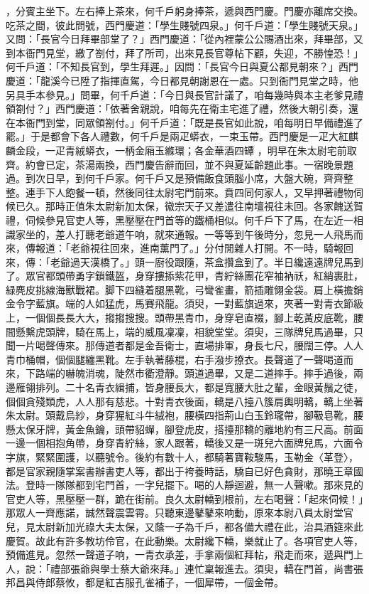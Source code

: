 \begin{showcontents}{}
，分賓主坐下。左右捧上茶來，何千戶躬身捧茶，遞與西門慶。門慶亦離席交換。吃茶之間，彼此問號，西門慶道：「學生賤號四泉。」何千戶道：「學生賤號天泉。」又問：「長官今日拜畢部堂了？」西門慶道：「從內裡蒙公公賜酒出來，拜畢部，又到本衙門見堂，繳了劄付，拜了所司，出來見長官尊帖下顧，失迎，不勝惶恐！」何千戶道：「不知長官到，學生拜遲。」因問：「長官今日與夏公都見朝來？」西門慶道：「龍溪今已陞了指揮直駕，今日都見朝謝恩在一處。只到衙門見堂之時，他另具手本參見。」問畢，何千戶道：「今日與長官計議了，咱每幾時與本主老爹見禮領劄付？」西門慶道：「依著舍親說，咱每先在衛主宅進了禮，然後大朝引奏，還在本衙門到堂，同眾領劄付。」何千戶道：「既是長官如此說，咱每明日早備禮進了罷。」于是都會下各人禮數，何千戶是兩疋蟒衣，一束玉帶。西門慶是一疋大紅麒麟金段，一疋青絨蟒衣，一柄金廂玉縧環；各金華酒四罈 ，明早在朱太尉宅前取齊。約會已定，茶湯兩換，西門慶告辭而回，並不與夏延齡題此事。一宿晚景題過。到次日早，到何千戶家。何千戶又是預備飯食頭腦小席，大盤大碗，齊齊整整。連手下人飽餐一頓，然後同往太尉宅門前來。賁四同何家人，又早押著禮物伺候已久。那時正值朱太尉新加太保，徽宗天子又差遣往南壇視往未回。各家餽送賀禮，伺候參見官吏人等，黑壓壓在門首等的鐵桶相似。何千戶下了馬，在左近一相識家坐的，差人打聽老爺道午响，就來通報。一等等到午後時分，忽見一人飛馬而來，傳報道：「老爺視往回來，進南薰門了。」分付閒雜人打開。不一時，騎報回來，傳：「老爺過天漢橋了。」頭一廚役跟隨，茶盒攢盒到了。半日纔遠遠牌兒馬到了。眾官都頭帶勇字鎖鐵盔，身穿摟掭紫花甲，青紵絲團花窄袖衲祅，紅綃裹肚，緑麂皮挑線海獸戰裙。脚下四縫着腿黑靴，弓彎雀畫，箭插雕翎金袋。肩上橫擔銷金令字藍旗。端的人如猛虎，馬賽飛龍。須臾，一對藍旗過來，夾著一對青衣節級上，一個個長長大大，搊搊搜搜。頭帶黑青巾，身穿皂直裰，腳上乾黃皮底靴，腰間懸繫虎頭牌，騎在馬上，端的威風凜凜，相貌堂堂。須臾，三隊牌兒馬過畢，只聞一片喝聲傳來。那傳道者都是金吾衛士，直場排軍，身長七尺，腰闊三停。人人青巾桶帽，個個腿纏黑靴。左手執著藤棍，右手潑步撩衣。長聲道了一聲喝道而來，下路端的嚇魄消魂，陡然市衢澄靜。頭道過畢，又是二道摔手。摔手過後，兩邊雁翎排列。二十名青衣緝捕，皆身腰長大，都是寬腰大肚之輩，金眼黃鬚之徒，個個貪殘類虎，人人那有慈悲。十對青衣後面，轎是八擡八簇肩輿明轎，轎上坐著朱太尉。頭戴烏紗，身穿猩紅斗牛絨袍，腰橫四指荊山白玉鈴瓏帶，腳靸皂靴，腰懸太保牙牌，黃金魚鑰，頭帶貂蟬，腳登虎皮，搭擡那轎的離地約有三尺高。前面一邊一個相抱角帶，身穿青紵絲，家人跟著，轎後又是一斑兒六面牌兒馬，六面令字旗，緊緊圍護，以聽號令。後約有數十人，都騎著寶鞍駿馬，玉勒金〈革登〉，都是官家親隨掌案書辦書吏人等，都出于袴養時話，驕自已好色貪財，那曉王章國法。登時一隊隊都到宅門首，一字兒擺下。喝的人靜迴避，無一人聲嗽。那來見的官吏人等，黑壓壓一群，跪在街前。良久太尉轎到根前，左右喝聲：「起來伺候！」那眾人一齊應諾，誠然聲震雲霄。只聽東邊鼕鼕來响動，原來本尉八員太尉堂官兒，見太尉新加光祿大夫太保，又蔭一子為千戶，都各備大禮在此，治具酒筵來此慶賀。故此有許多教坊伶官，在此動樂。太尉纔下轎，樂就止了。各項官吏人等，預備進見。忽然一聲道子响，一青衣承差，手拿兩個紅拜帖，飛走而來，遞與門上人，說：「禮部張爺與學士蔡大爺來拜。」連忙稟報進去。須臾，轎在門首，尚書張邦昌與侍郎蔡攸，都是紅吉服孔雀補子，一個犀帶，一個金帶。
\end{showcontents}
